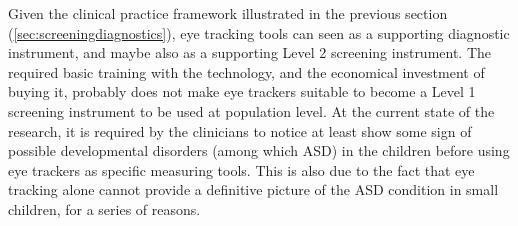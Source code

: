\newline



Given the clinical practice framework illustrated in the previous section (\ref{sec:screeningdiagnostics}), eye tracking tools can seen as a supporting diagnostic instrument, and maybe also as a supporting Level 2 screening instrument. The required basic training with the technology, and the economical investment of buying it, probably does not make eye trackers suitable to become a Level 1 screening instrument to be used at population level. At the current state of the research, it is required by the clinicians to notice at least show some sign of possible developmental disorders (among which ASD) in the children before using eye trackers as specific measuring tools. This is also due to the fact that eye tracking alone cannot provide a definitive picture of the ASD condition in small children, for a series of reasons.

